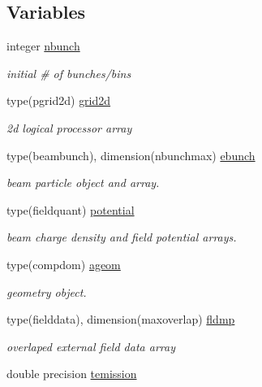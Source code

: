 \subsection*{Variables}
\begin{DoxyCompactItemize}
\item 
integer \mbox{\hyperlink{namespaceaccsimulatorclass_ae195202b2f2b61cf84479c9303847e9d}{nbunch}}
\begin{DoxyCompactList}\small\item\em initial \# of bunches/bins \end{DoxyCompactList}\item 
type(pgrid2d) \mbox{\hyperlink{namespaceaccsimulatorclass_a7482c27516337dfcffc2711f52ed4063}{grid2d}}
\begin{DoxyCompactList}\small\item\em 2d logical processor array \end{DoxyCompactList}\item 
type(beambunch), dimension(nbunchmax) \mbox{\hyperlink{namespaceaccsimulatorclass_a8da4a6c0ffe4700d0d0882e7d612d78c}{ebunch}}
\begin{DoxyCompactList}\small\item\em beam particle object and array. \end{DoxyCompactList}\item 
type(fieldquant) \mbox{\hyperlink{namespaceaccsimulatorclass_a1cc972750a5e9da439930d5ce96bd399}{potential}}
\begin{DoxyCompactList}\small\item\em beam charge density and field potential arrays. \end{DoxyCompactList}\item 
type(compdom) \mbox{\hyperlink{namespaceaccsimulatorclass_a7731609bfc9a7f895ee523fc43b42e6f}{ageom}}
\begin{DoxyCompactList}\small\item\em geometry object. \end{DoxyCompactList}\item 
type(fielddata), dimension(maxoverlap) \mbox{\hyperlink{namespaceaccsimulatorclass_a32382286ea3f39a41f213e651b77deba}{fldmp}}
\begin{DoxyCompactList}\small\item\em overlaped external field data array \end{DoxyCompactList}\item 
double precision \mbox{\hyperlink{namespaceaccsimulatorclass_a28fd069f7896f70d589d4c2cfbba638c}{temission}}

\end{DoxyCompactItemize}
